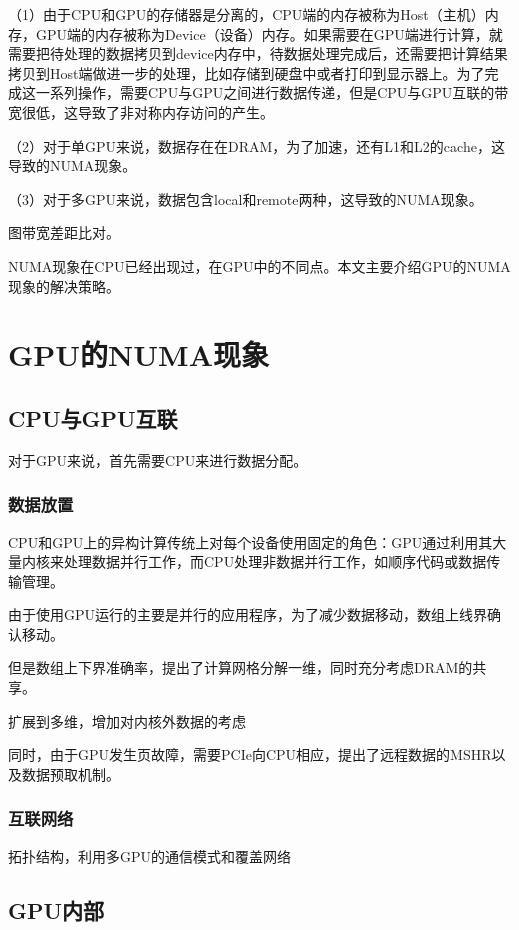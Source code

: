 \documentclass{cjc}
\begin{document}
（1）由于CPU和GPU的存储器是分离的，CPU端的内存被称为Host（主机）内存，GPU端的内存被称为Device（设备）内存。如果需要在GPU端进行计算，就需要把待处理的数据拷贝到device内存中，待数据处理完成后，还需要把计算结果拷贝到Host端做进一步的处理，比如存储到硬盘中或者打印到显示器上。为了完成这一系列操作，需要CPU与GPU之间进行数据传递，但是CPU与GPU互联的带宽很低，这导致了非对称内存访问的产生。

  
（2）对于单GPU来说，数据存在在DRAM，为了加速，还有L1和L2的cache，这导致的NUMA现象。

（3）对于多GPU来说，数据包含local和remote两种，这导致的NUMA现象。

图带宽差距比对。

NUMA现象在CPU已经出现过，在GPU中的不同点。本文主要介绍GPU的NUMA现象的解决策略。

\section{GPU的NUMA现象}

\subsection{CPU与GPU互联}

对于GPU来说，首先需要CPU来进行数据分配。

\subsubsection{数据放置}

CPU和GPU上的异构计算传统上对每个设备使用固定的角色：GPU通过利用其大量内核来处理数据并行工作，而CPU处理非数据并行工作，如顺序代码或数据传输管理。

由于使用GPU运行的主要是并行的应用程序，为了减少数据移动，数组上线界确认移动。

但是数组上下界准确率，提出了计算网格分解一维，同时充分考虑DRAM的共享。

扩展到多维，增加对内核外数据的考虑

同时，由于GPU发生页故障，需要PCIe向CPU相应，提出了远程数据的MSHR以及数据预取机制。

\subsubsection{互联网络}

拓扑结构，利用多GPU的通信模式和覆盖网络


\subsection{GPU内部}
\end{document}
